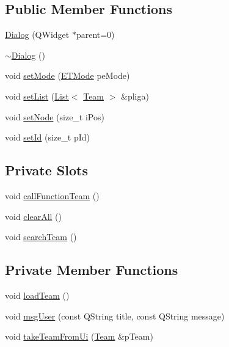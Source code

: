\subsection*{Public Member Functions}
\begin{DoxyCompactItemize}
\item 
\hyperlink{class_dialog_acfa2063f9f962d394c6a645b6e7e08d8}{Dialog} (Q\+Widget $\ast$parent=0)
\item 
\hyperlink{class_dialog_a2a1fe6ef28513eed13bfcd3a4da83ccb}{$\sim$\+Dialog} ()
\item 
void \hyperlink{class_dialog_adc05cff2da1c925917d2301d730eebd8}{set\+Mode} (\hyperlink{class_dialog_ae78164fb050172481b9bc05bdbbdc9b0}{E\+T\+Mode} pe\+Mode)
\item 
void \hyperlink{class_dialog_a49ad60e52f0e52fa4ec27b67964913fa}{set\+List} (\hyperlink{class_list}{List}$<$ \hyperlink{class_team}{Team} $>$ \&pliga)
\item 
void \hyperlink{class_dialog_a3fe34fdf51dce326e10b7b2eef8ae6ea}{set\+Node} (size\+\_\+t i\+Pos)
\item 
void \hyperlink{class_dialog_ad8dc7674caf8ad80354371cb055e2d86}{set\+Id} (size\+\_\+t p\+Id)
\end{DoxyCompactItemize}
\subsection*{Private Slots}
\begin{DoxyCompactItemize}
\item 
void \hyperlink{class_dialog_a1875941a0c922fa231c8c40d3c46a481}{call\+Function\+Team} ()
\item 
void \hyperlink{class_dialog_af320e47136611f472953f85ec66f6bf6}{clear\+All} ()
\item 
void \hyperlink{class_dialog_a14e25a37abc03cea2b0aaf7dc91fe857}{search\+Team} ()
\end{DoxyCompactItemize}
\subsection*{Private Member Functions}
\begin{DoxyCompactItemize}
\item 
void \hyperlink{class_dialog_a6f6564b3dab010fadb064d1bb46ac37c}{load\+Team} ()
\item 
void \hyperlink{class_dialog_a29ddbbd67ffdca68c35bd2692deef08b}{msg\+User} (const Q\+String title, const Q\+String message)
\item 
void \hyperlink{class_dialog_a03a550e5b4fa16614d27f8d4e2329e10}{take\+Team\+From\+Ui} (\hyperlink{class_team}{Team} \&p\+Team)
\end{DoxyCompactItemize}
